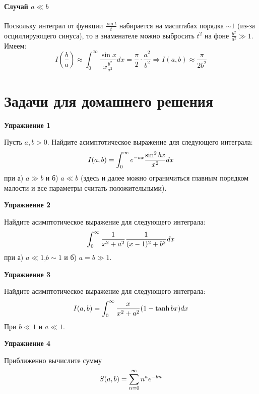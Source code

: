 \documentclass[a4paper,12pt]{article}
\begin{document}
\paragraph{Случай $a\ll b$}

Поскольку интеграл от функции $\frac{\sin t}{t}$ набирается на масштабах
порядка $\sim1$ (из-за осциллирующего синуса), то в знаменателе можно
выбросить $t^{2}$ на фоне $\frac{b^{2}}{a^{2}}\gg1$. Имеем:
\[
I\left(\frac{b}{a}\right)\approx\int_{0}^{\infty}\frac{\sin x}{x\frac{b^{2}}{a^{2}}}dx=\frac{\pi}{2}\cdot\frac{a^{2}}{b^{2}} \Rightarrow I(a,b) \approx \frac{\pi}{2 b^2}
\]
\newpage


\section{Задачи для домашнего решения}
\noindent \textbf{Упражнение 1}

\noindent Пусть $a,b>0$. Найдите асимптотическое выражение для следующего интеграла:
\begin{equation}\notag
I(a,b)=\int_{0}^{\infty}e^{-ax}\frac{\sin^{2}bx}{x^{2}}dx	
\end{equation}
\noindent при а) $a\gg b$ и б) $a\ll b$ (здесь и далее можно ограничиться главным порядком малости и все параметры считать положительными).

\vspace{15pt}
\noindent \textbf{Упражнение 2}

\noindent Найдите асимптотическое выражение для следующего интеграла:
\begin{equation}\notag
\int_{0}^{\infty}\frac{1}{x^{2}+a^{2}}\frac{1}{(x-1)^{2}+b^{2}}dx
\end{equation}
\noindent при а) $a\ll 1$,\quad $b\sim 1$ и б) $a=b\gg1$.

\vspace{15pt}
\noindent \textbf{Упражнение 3}

\noindent Найдите асимптотическое выражение для следующего интеграла:
\begin{equation}\notag
I(a,b)	=\int_{0}^{\infty}\frac{x}{x^{2}+a^{2}}(1-\tanh bx)dx
\end{equation}
\noindent При $b\ll 1$ и $a\ll 1$.

\vspace{15pt}
\noindent \textbf{Упражнение 4}

\noindent Приближенно вычислите сумму
\begin{equation}\notag
S(a,b)	=\sum_{n=0}^{\infty}n^{a}e^{-bn}
\end{equation}
\end{document}
